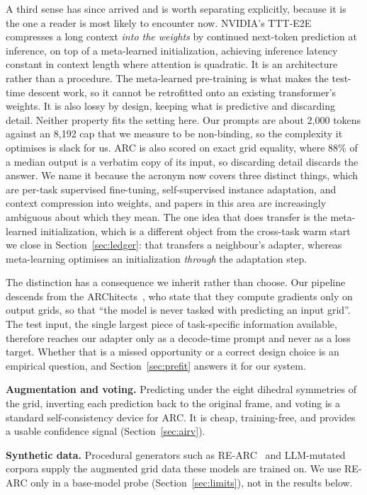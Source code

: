 \documentclass[11pt]{article}
\begin{document}
A third sense has since arrived and is worth separating explicitly, because it is the one a reader
is most likely to encounter now. NVIDIA's TTT-E2E~\cite{ttte2e} compresses a long context
\emph{into the weights} by continued next-token prediction at inference, on top of a meta-learned
initialization, achieving inference latency constant in context length where attention is quadratic.
It is an architecture rather than a procedure. The meta-learned pre-training is what makes the
test-time descent work, so it cannot be retrofitted onto an existing transformer's weights. It is
also lossy by design, keeping what is predictive and discarding detail. Neither property fits the
setting here. Our prompts are about 2{,}000 tokens against an 8{,}192 cap that we measure to be
non-binding, so the complexity it optimises is slack for us. ARC is also scored on exact grid
equality, where 88\% of a median output is a verbatim copy of its input, so discarding detail
discards the answer. We name it because the acronym now covers three distinct things, which are per-task
supervised fine-tuning, self-supervised instance adaptation, and context compression into weights,
and papers in this area are increasingly ambiguous about which they mean. The one idea that does
transfer is the meta-learned initialization, which is a different object from the cross-task warm
start we close in Section~\ref{sec:ledger}: that transfers a neighbour's adapter, whereas
meta-learning optimises an initialization \emph{through} the adaptation step.

The distinction has a consequence we inherit rather than choose. Our pipeline descends from the
ARChitects~\cite{architects2025}, who state that they compute gradients only on output grids, so
that ``the model is never tasked with predicting an input grid''. The test input, the single largest
piece of task-specific information available, therefore reaches our adapter only as a decode-time
prompt and never as a loss target. Whether that is a missed opportunity or a correct design choice
is an empirical question, and Section~\ref{sec:prefit} answers it for our system.

\textbf{Augmentation and voting.} Predicting under the eight dihedral symmetries of the grid,
inverting each prediction back to the original frame, and voting is a standard self-consistency
device for ARC. It is cheap, training-free, and provides a usable confidence signal
(Section~\ref{sec:airv}).

\textbf{Synthetic data.} Procedural generators such as RE-ARC~\cite{rearc} and LLM-mutated corpora
supply the augmented grid data these models are trained on. We use RE-ARC only in a base-model
probe (Section~\ref{sec:limits}), not in the results below.
\end{document}
